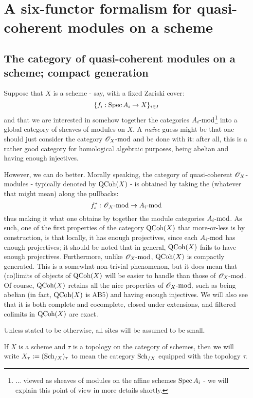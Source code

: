 \section{A six-functor formalism for quasi-coherent modules on a scheme}
    \subsection{The category of quasi-coherent modules on a scheme; compact generation}
        Suppose that $X$ is a scheme - say, with a fixed Zariski cover:
            $$\{ f_i: \Spec A_i \to X \}_{i \in I}$$
        and that we are interested in somehow  together the categories $A_i\mod$\footnote{... viewed as sheaves of modules on the affine schemes $\Spec A_i$ - we will explain this point of view in more details shortly.} into a global category of sheaves of modules on $X$. A \textit{na\"ive} guess might be that one should just consider the category $\scrO_X\mod$ and be done with it: after all, this is a rather good category for homological algebraic purposes, being abelian and having enough injectives.
        
        However, we can do better. Morally speaking, the category of quasi-coherent $\scrO_X$-modules - typically denoted by $\QCoh(X)$ - is obtained by taking the  (whatever that might mean) along the pullbacks:
            $$f^*_i: \scrO_X\mod \to A_i\mod$$
        thus making it what one obtains by  together the module categories $A_i\mod$. As such, one of the first properties of the category $\QCoh(X)$ that more-or-less is by construction, is that locally, it has enough projectives, since each $A_i\mod$ has enough projectives; it should be noted that in general, $\QCoh(X)$ fails to have enough  projectives. Furthermore, unlike $\scrO_X\mod$, $\QCoh(X)$ is compactly generated. This is a somewhat non-trivial phenomenon, but it does mean that (co)limits of objects of $\QCoh(X)$ will be easier to handle than those of $\scrO_X\mod$. Of course, $\QCoh(X)$ retains all the nice properties of $\scrO_X\mod$, such as being abelian (in fact, $\QCoh(X)$ is AB5) and having enough injectives. We will also see that it is both complete and cocomplete, closed under extensions, and filtered colimits in $\QCoh(X)$ are exact.

        \begin{convention}
            Unless stated to be otherwise, all sites will be assumed to be small. 

            If $X$ is a scheme and $\tau$ is a topology on the category of schemes, then we will write $X_{\tau} := (\Sch_{/X})_{\tau}$ to mean the category $\Sch_{/X}$ equipped with the topology $\tau$. 
        \end{convention}

